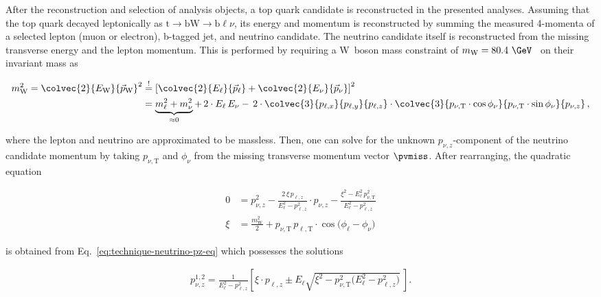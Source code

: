After the reconstruction and selection of analysis objects, a top quark candidate is reconstructed in the presented analyses. Assuming that the top quark decayed leptonically as $\mathrm{t}\to\mathrm{b}\mathrm{W}\to\mathrm{b}\ell\nu$, its energy and momentum is reconstructed by summing the measured 4-momenta of a selected lepton (muon or electron), b-tagged jet, and neutrino candidate. The neutrino candidate itself is reconstructed from the missing transverse energy and the lepton momentum. This is performed by requiring a W~boson mass constraint of $m_\mathrm{W}=80.4~\GeV$~\cite{Olive:2016xmw} on their invariant mass as

\begin{align}
m_\mathrm{W}^2=\colvec{2}{E_\mathrm{W}}{\vec{p}_\mathrm{W}}^{2}&\overset{!}{=}\left[\colvec{2}{E_{\ell}}{\vec{p}_{\ell}}+\colvec{2}{E_{\nu}}{\vec{p}_{\nu}}\right]^{2}\nonumber\\
&=\underbrace{m_{\ell}^2+m_{\nu}^2}_{\approx 0}+\,2\cdot E_{\ell}\,E_{\nu}-\,2\cdot\colvec{3}{p_{\ell,x}}{p_{\ell,y}}{p_{\ell,z}}\cdot\colvec{3}{p_{\nu,\mathrm{T}}\cdot\cos\phi_{\nu}}{p_{\nu,\mathrm{T}}\cdot\sin\phi_{\nu}}{p_{\nu,z}}\,, \label{eq:technique-neutrino-pz-eq}
\end{align}

where the lepton and neutrino are approximated to be massless. Then, one can solve for the unknown $p_{\nu,z}$-component of the neutrino candidate momentum by taking $p_{\nu,\mathrm{T}}$ and $\phi_{\nu}$ from the missing transverse momentum vector $\pvmiss$. After rearranging, the quadratic equation 

\begin{subequations}
\begin{align}
0&=p_{\nu,z}^2-\frac{2\,\xi\,p_{\ell,z}}{E_{\ell}^{2}-p_{\ell,z}^2}\cdot p_{\nu,z}-\frac{\xi^{2}-E_{\ell}^{2}\,p_{\nu,\mathrm{T}}^2}{E_{\ell}^{2}-p_{\ell,z}^2}\\
\xi&=\frac{m_\mathrm{W}^2}{2}+p_{\nu,\mathrm{T}}\,p_{\ell,\mathrm{T}}\cdot\cos\big(\phi_\ell-\phi_\nu\big)
\end{align}
\end{subequations}

is obtained from Eq.~\ref{eq:technique-neutrino-pz-eq} which possesses the solutions

\begin{align}
p_{\nu,z}^{1,2}=\frac{1}{E_{\ell}^{2}-p_{\ell,z}^{2}}\left[\xi\cdot p_{\ell,z}\pm E_{\ell} \sqrt{\xi^2-p_{\nu,\mathrm{T}}^2\big(E_{\ell}^2-p_{\ell,z}^2\big)}~\right]. \label{eq:technique-neutrino-pz}
\end{align}

